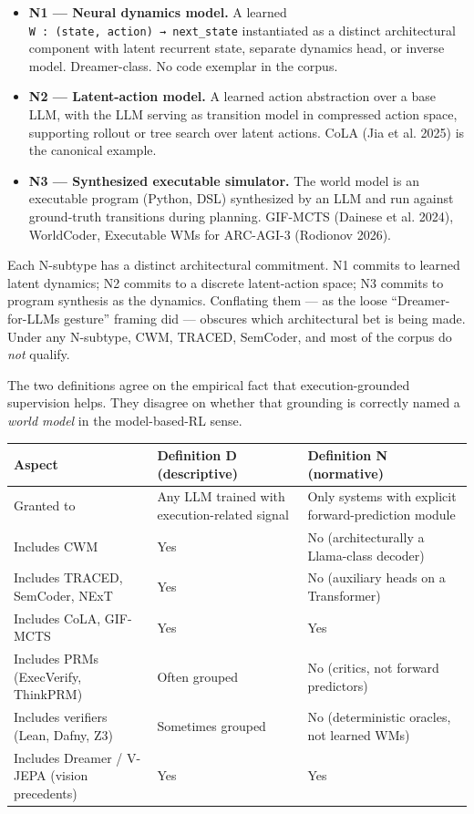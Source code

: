 \documentclass{article}
\providecommand{\tightlist}{\setlength{\itemsep}{0pt}\setlength{\parskip}{0pt}}
\begin{document}
\begin{itemize}
\tightlist
\item
  \textbf{N1 --- Neural dynamics model.} A learned
  \texttt{W\ :\ (state,\ action)\ →\ next\_state} instantiated as a
  distinct architectural component with latent recurrent state, separate
  dynamics head, or inverse model. Dreamer-class. No code exemplar in
  the corpus.
\item
  \textbf{N2 --- Latent-action model.} A learned action abstraction over
  a base LLM, with the LLM serving as transition model in compressed
  action space, supporting rollout or tree search over latent actions.
  CoLA (Jia et al. 2025) is the canonical example.
\item
  \textbf{N3 --- Synthesized executable simulator.} The world model is
  an executable program (Python, DSL) synthesized by an LLM and run
  against ground-truth transitions during planning. GIF-MCTS (Dainese et
  al. 2024), WorldCoder, Executable WMs for ARC-AGI-3 (Rodionov 2026).
\end{itemize}

Each N-subtype has a distinct architectural commitment. N1 commits to
learned latent dynamics; N2 commits to a discrete latent-action space;
N3 commits to program synthesis as the dynamics. Conflating them --- as
the loose ``Dreamer-for-LLMs gesture'' framing did --- obscures which
architectural bet is being made. Under any N-subtype, CWM, TRACED,
SemCoder, and most of the corpus do \emph{not} qualify.

The two definitions agree on the empirical fact that execution-grounded
supervision helps. They disagree on whether that grounding is correctly
named a \emph{world model} in the model-based-RL sense.

\begin{longtable}[]{@{}
  >{\raggedright\arraybackslash}p{}
  >{\raggedright\arraybackslash}p{}
  >{\raggedright\arraybackslash}p{}@{}}
\toprule
Aspect & Definition D (descriptive) & Definition N (normative) \\
\midrule
\endhead
Granted to & Any LLM trained with execution-related signal & Only
systems with explicit forward-prediction module \\
Includes CWM & Yes & No (architecturally a Llama-class decoder) \\
Includes TRACED, SemCoder, NExT & Yes & No (auxiliary heads on a
Transformer) \\
Includes CoLA, GIF-MCTS & Yes & Yes \\
Includes PRMs (ExecVerify, ThinkPRM) & Often grouped & No (critics, not
forward predictors) \\
Includes verifiers (Lean, Dafny, Z3) & Sometimes grouped & No
(deterministic oracles, not learned WMs) \\
Includes Dreamer / V-JEPA (vision precedents) & Yes & Yes \\
\bottomrule
\end{longtable}
\end{document}
